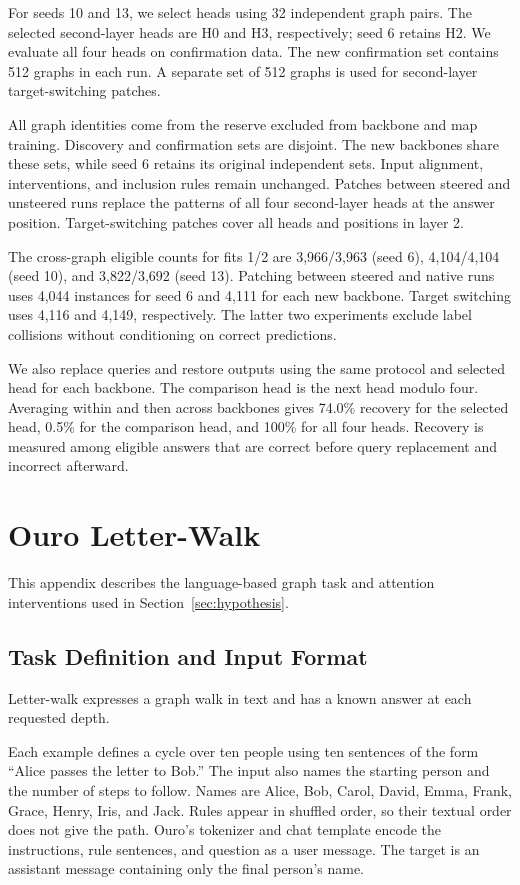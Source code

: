 \documentclass{article}
\begin{document}
For seeds 10 and 13, we select heads using 32 independent graph pairs. The selected second-layer heads are H0 and H3, respectively; seed 6 retains H2. We evaluate all four heads on confirmation data. The new confirmation set contains 512 graphs in each run. A separate set of 512 graphs is used for second-layer target-switching patches.

All graph identities come from the reserve excluded from backbone and map training. Discovery and confirmation sets are disjoint. The new backbones share these sets, while seed 6 retains its original independent sets. Input alignment, interventions, and inclusion rules remain unchanged. Patches between steered and unsteered runs replace the patterns of all four second-layer heads at the answer position. Target-switching patches cover all heads and positions in layer 2.

The cross-graph eligible counts for fits 1/2 are 3,966/3,963 (seed 6), 4,104/4,104 (seed 10), and 3,822/3,692 (seed 13). Patching between steered and native runs uses 4,044 instances for seed 6 and 4,111 for each new backbone. Target switching uses 4,116 and 4,149, respectively. The latter two experiments exclude label collisions without conditioning on correct predictions.

We also replace queries and restore outputs using the same protocol and selected head for each backbone. The comparison head is the next head modulo four. Averaging within and then across backbones gives 74.0\% recovery for the selected head, 0.5\% for the comparison head, and 100\% for all four heads. Recovery is measured among eligible answers that are correct before query replacement and incorrect afterward.

\section{Ouro Letter-Walk}
\label{app:parallel}
This appendix describes the language-based graph task and attention interventions used in Section~\ref{sec:hypothesis}.

\subsection{Task Definition and Input Format}
Letter-walk expresses a graph walk in text and has a known answer at each requested depth.

Each example defines a cycle over ten people using ten sentences of the form ``Alice passes the letter to Bob.'' The input also names the starting person and the number of steps to follow. Names are Alice, Bob, Carol, David, Emma, Frank, Grace, Henry, Iris, and Jack. Rules appear in shuffled order, so their textual order does not give the path. Ouro's tokenizer and chat template encode the instructions, rule sentences, and question as a user message. The target is an assistant message containing only the final person's name.
\end{document}

